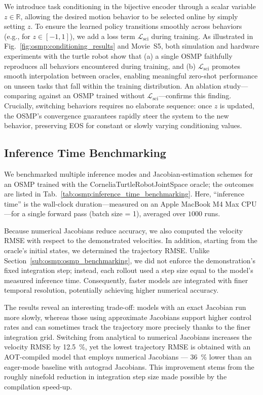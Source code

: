 We introduce task conditioning in the bijective encoder through a scalar variable $z \in \mathbb{R}$, allowing the desired motion behavior to be selected online by simply setting $z$. To ensure the learned policy transitions smoothly across behaviors (e.g., for $z \in [-1, 1]$), we add a loss term $\mathcal{L}_\mathrm{sci}$ during training. As illustrated in Fig.~\ref{fig:osmp:conditioning_results} and Movie~S5, both simulation and hardware experiments with the turtle robot show that (a) a single \gls{OSMP} faithfully reproduces all behaviors encountered during training, and (b) $\mathcal{L}_\mathrm{sci}$ promotes smooth interpolation between oracles, enabling meaningful zero-shot performance on unseen tasks that fall within the training distribution. An ablation study—comparing against an \gls{OSMP} trained without $\mathcal{L}_\mathrm{sci}$—confirms this finding. Crucially, switching behaviors requires no elaborate sequence: once $z$ is updated, the \gls{OSMP}’s convergence guarantees rapidly steer the system to the new behavior, preserving EOS for constant or slowly varying conditioning values.

\subsection{Inference Time Benchmarking}
We benchmarked multiple inference modes and Jacobian‐estimation schemes for an \gls{OSMP} trained with the CorneliaTurtleRobotJointSpace oracle; the outcomes are listed in Tab.~\ref{tab:osmp:inference_time_benchmarking}. Here, “inference time” is the wall-clock duration—measured on an Apple MacBook M4 Max CPU—for a single forward pass (batch size = 1), averaged over $1000$ runs.

Because numerical Jacobians reduce accuracy, we also computed the velocity RMSE with respect to the demonstrated velocities. In addition, starting from the oracle’s initial states, we determined the trajectory RMSE. Unlike Section~\ref{sub:osmp:osmp_benchmarking}, we did not enforce the demonstration’s fixed integration step; instead, each rollout used a step size equal to the model’s measured inference time. Consequently, faster models are integrated with finer temporal resolution, potentially achieving higher numerical accuracy.

The results reveal an interesting trade-off: models with an exact Jacobian run more slowly, whereas those using approximate Jacobians support higher control rates and can sometimes track the trajectory more precisely thanks to the finer integration grid. Switching from analytical to numerical Jacobians increases the velocity RMSE by \SI{12.5}{\percent}, yet the lowest trajectory \gls{RMSE} is obtained with an \gls{AOT}-compiled model that employs numerical Jacobians — \SI{36}{\percent} lower than an eager-mode baseline with autograd Jacobians. This improvement stems from the roughly ninefold reduction in integration step size made possible by the compilation speed-up.

